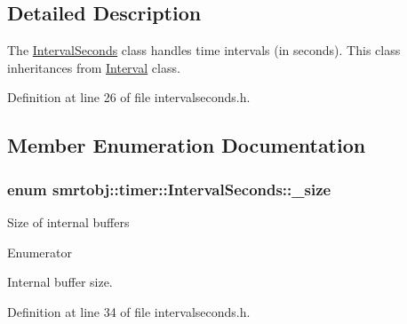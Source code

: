 \subsection{Detailed Description}
The \hyperlink{classsmrtobj_1_1timer_1_1_interval_seconds}{Interval\+Seconds} class handles time intervals (in seconds). This class inheritances from \hyperlink{classsmrtobj_1_1timer_1_1_interval_aaf7a279101cc8d105693107d9bdcb26a}{Interval} class. 

Definition at line 26 of file intervalseconds.\+h.



\subsection{Member Enumeration Documentation}
\hypertarget{classsmrtobj_1_1timer_1_1_interval_seconds_ab2187a2f2aab3fb8d6fcebba3680f764}{}
\subsubsection[{\+\_\+size}]{\setlength{\rightskip}{0pt plus 5cm}enum {\bf smrtobj\+::timer\+::\+Interval\+Seconds\+::\+\_\+size}}\label{classsmrtobj_1_1timer_1_1_interval_seconds_ab2187a2f2aab3fb8d6fcebba3680f764}
Size of internal buffers \begin{Desc}
\item[Enumerator]\par
\begin{description}
\item[{\em 
\hypertarget{classsmrtobj_1_1timer_1_1_interval_seconds_ab2187a2f2aab3fb8d6fcebba3680f764af1f97577d8278e2e1b54551fafd67e0d}{}S\+I\+Z\+E\+\_\+\+B\+U\+F\+F\+E\+R\label{classsmrtobj_1_1timer_1_1_interval_seconds_ab2187a2f2aab3fb8d6fcebba3680f764af1f97577d8278e2e1b54551fafd67e0d}
}]Internal buffer size. \end{description}
\end{Desc}


Definition at line 34 of file intervalseconds.\+h.

